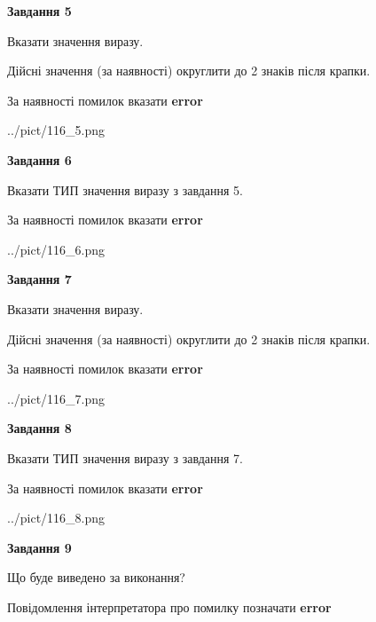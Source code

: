 \documentclass[11pt, ukrainian]{article}
\begin{document}
{\begin {large}
{\begin {center}\textbf{Завдання 5}\end {center}}\par
Вказати значення виразу. \par
Дійсні значення (за наявності) округлити до 2 знаків після крапки. \par
За наявності помилок вказати \textbf{error}

\begin{center}
	{../pict/116_5.png}
\end{center}
\newpage

{\begin {center}\textbf{Завдання 6}\end {center}}\par
Вказати ТИП значення виразу з завдання 5. \par
За наявності помилок вказати \textbf{error}

\begin{center}
	{../pict/116_6.png}
\end{center}
\newpage

{\begin {center}\textbf{Завдання 7}\end {center}}\par
Вказати значення виразу. \par
Дійсні значення (за наявності) округлити до 2 знаків після крапки. \par
За наявності помилок вказати \textbf{error}

\begin{center}
	{../pict/116_7.png}
\end{center}
\newpage

{\begin {center}\textbf{Завдання 8}\end {center}}\par
Вказати ТИП значення виразу з завдання 7. \par
За наявності помилок вказати \textbf{error}

\begin{center}
	{../pict/116_8.png}
\end{center}
\newpage

{\begin {center}\textbf{Завдання 9}\end {center}}\par
Що буде виведено за виконання? \par
Повідомлення інтерпретатора про помилку позначати \textbf{error}


\end{large}}
\end{document}
